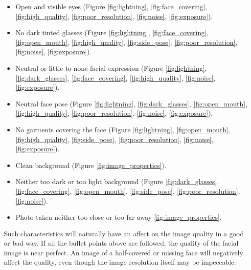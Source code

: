 \begin{itemize}
    \item Open and visible eyes (Figure \ref{fig:lightning}, \ref{fig:face_covering}, \ref{fig:high_quality}, \ref{fig:poor_resolution}, \ref{fig:noise}, \ref{fig:exposure}).
    \item No dark tinted glasses (Figure \ref{fig:lightning}, \ref{fig:face_covering}, \ref{fig:open_mouth}, \ref{fig:high_quality}, \ref{fig:side_pose}, \ref{fig:poor_resolution}, \ref{fig:noise}, \ref{fig:exposure}). 
    \item Neutral or little to none facial expression (Figure \ref{fig:lightning}, \ref{fig:dark_glasses}, \ref{fig:face_covering}, \ref{fig:high_quality}, \ref{fig:noise}, \ref{fig:exposure}).
    \item Neutral face pose (Figure \ref{fig:lightning}, \ref{fig:dark_glasses}, \ref{fig:open_mouth}, \ref{fig:high_quality}, \ref{fig:poor_resolution}, \ref{fig:noise}, \ref{fig:exposure}).
    \item No garments covering the face (Figure \ref{fig:lightning}, \ref{fig:open_mouth}, \ref{fig:high_quality}, \ref{fig:side_pose}, \ref{fig:poor_resolution}, \ref{fig:noise}, \ref{fig:exposure}). 
    \item Clean background (Figure \ref{fig:image_properties}).
    \item Neither too dark or too light background (Figure \ref{fig:dark_glasses}, \ref{fig:face_covering}, \ref{fig:open_mouth}, \ref{fig:side_pose}, \ref{fig:poor_resolution}, \ref{fig:noise}).
    \item Photo taken neither too close or too far away \ref{fig:image_properties}.
\end{itemize} 
%
Such characteristics will naturally have an affect on the image quality in a good or bad way. If all the bullet points above are followed, the quality of the facial image is near perfect. An image of a half-covered or missing face will negatively affect the quality, even though the image resolution itself may be impeccable. 
\newpage
